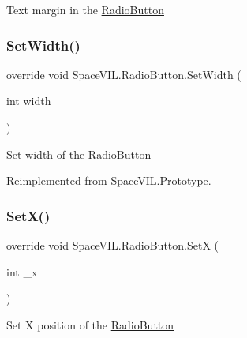 Text margin in the \mbox{\hyperlink{class_space_v_i_l_1_1_radio_button}{Radio\+Button}} 

\mbox{\label{class_space_v_i_l_1_1_radio_button_a1272cbc6fa73f98592a91b53d1aa280a}} 
\subsubsection{\texorpdfstring{Set\+Width()}{SetWidth()}}
{\footnotesize\ttfamily override void Space\+V\+I\+L.\+Radio\+Button.\+Set\+Width (\begin{DoxyParamCaption}\item[{int}]{width }\end{DoxyParamCaption})\hspace{0.3cm}{\ttfamily [virtual]}}



Set width of the \mbox{\hyperlink{class_space_v_i_l_1_1_radio_button}{Radio\+Button}} 



Reimplemented from \mbox{\hyperlink{class_space_v_i_l_1_1_prototype_a6a4f1b9581f4d18f1c3a3e287d4b2a2b}{Space\+V\+I\+L.\+Prototype}}.

\mbox{\label{class_space_v_i_l_1_1_radio_button_ad7c30a94e2cb0ef1ee4b7678b7d322ef}} 
\subsubsection{\texorpdfstring{Set\+X()}{SetX()}}
{\footnotesize\ttfamily override void Space\+V\+I\+L.\+Radio\+Button.\+SetX (\begin{DoxyParamCaption}\item[{int}]{\+\_\+x }\end{DoxyParamCaption})\hspace{0.3cm}{\ttfamily [virtual]}}



Set X position of the \mbox{\hyperlink{class_space_v_i_l_1_1_radio_button}{Radio\+Button}} 



